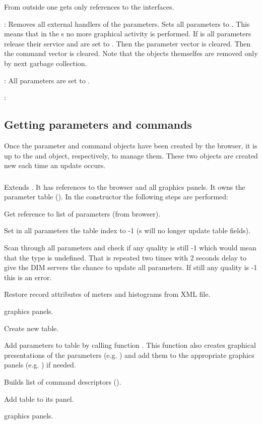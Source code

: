 From outside one gets only references to the interfaces.
\item [\func{protected releaseServices(boolean cleanup)}]: Removes all external handlers
of the parameters. Sets all parameters to . This means that in the
s no more graphical activity is performed.
If  is 
all parameters release their service and are set to . Then the parameter vector
is cleared. Then the command vector is cleared.
Note that the objects themselfes are removed only by next garbage collection.
\item [\func{protected enableServices()}]: 
All parameters are  set to .
\item [\func{}]: 
\edes
\subsection{Getting parameters and commands}
Once the parameter and command objects have been created by the browser, it is up to the 
 and  object, respectively, to manage them.
These two objects are created new each time an update occurs.
\subsubsection{}
Extends .
It has references to the browser and all graphics panels. It owns the parameter table
(). In the constructor the following steps are performed:
\bnum
\item Get reference to list of parameters (from browser).
\item Set in all parameters the table index to -1 (s will no longer update
table fields).
\item Scan through all parameters and check if any quality is still -1 which would mean
that the type is undefined. That is repeated two times with 2 seconds delay to give
the DIM servers the chance to update all parameters. If still any quality is -1 this is an error.
\item Restore record attributes of meters and histograms from XML file.
\item {} graphics panels.
\item Create new table.
\item Add parameters to table by calling function . This function
also creates graphical presentations of the parameters (e.g. ) and add them to the appropriate graphics panels (e.g. ) if needed.
\item Builds list of command descriptors ().
\item Add table to its panel.
\item {} graphics panels.
\enum
